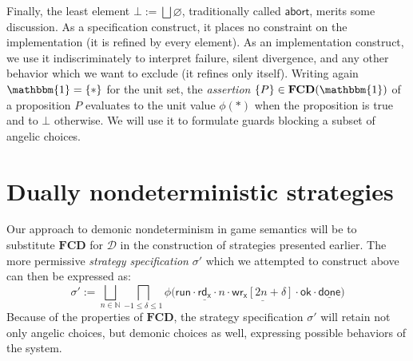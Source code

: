 \documentclass[draft,11pt]{report}
\theoremstyle{definition}
\newcommand{\kw}[1]{\ensuremath{ \mathsf{#1} }}
\begin{document}
Finally,
the least element $\bot := \bigsqcup \varnothing$,
traditionally called $\kw{abort}$,
merits some discussion.
As a specification construct,
it places no constraint on the implementation
(it is refined by every element).
As an implementation construct,
we use it indiscriminately to interpret
failure, silent divergence,
and any other behavior
which we want to exclude (it refines only itself).
Writing again $\mathbbm{1} = \{ * \}$ for the unit set,
the \emph{assertion} $\{P\} \in \mathbf{FCD}(\mathbbm{1})$ of a proposition $P$
evaluates to the unit value $\phi(*)$ when the proposition is true
and to $\bot$ otherwise.
We will use it to formulate guards
blocking a subset of angelic choices.

%
%


\section{Dually nondeterministic strategies} %

Our approach to demonic nondeterminism in game semantics
will be to substitute $\mathbf{FCD}$ for $\mathcal{D}$
in the construction of strategies presented earlier. 
The more permissive \emph{strategy specification} $\sigma'$
which we attempted to construct above
can then be expressed as:
\[
  \sigma' :=
    \bigsqcup_{n \in \mathbb{N}}
    \bigsqcap_{-1 \le \delta \le 1}
    \phi \big(
        \kw{run} \cdot
        \underline{\kw{rd}_\kw{x}} \cdot n \cdot
        \underline{\kw{wr}_\kw{x}[2n + \delta]} \cdot \kw{ok} \cdot
        \underline{\kw{done}} \big)
\]
Because of the properties of $\mathbf{FCD}$,
the strategy specification $\sigma'$ will retain
not only angelic choices,
but demonic choices as well,
expressing possible behaviors
of the system.
\end{document}
